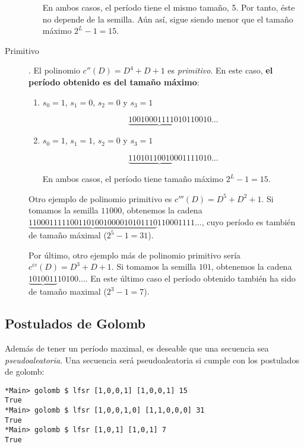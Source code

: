 \documentclass[10pt,spanish]{article}
\begin{document}
\begin{description}
\begin{enumerate}
        En ambos casos, el período tiene el mismo tamaño, 5. Por tanto, éste no depende de la semilla. Aún así, sigue siendo menor que el tamaño máximo $2^L - 1 = 15$.
    \end{enumerate}

    \item[Primitivo]. El polinomio $c''(D) = D^4 + D + 1$ es \textit{\textcolor{azul}{primitivo}}. En este caso, \textbf{\textcolor{azul}{el período obtenido es del tamaño máximo}}:

    \begin{enumerate}
        \item $s_0 = 1$, $s_1 = 0$, $s_2 = 0$ y $s_3 = 1$

        \begin{displaymath}
            \underbrace{100100011110101}10010\ldots
        \end{displaymath}

        \item $s_0 = 1$, $s_1 = 1$, $s_2 = 0$ y $s_3 = 1$

        \begin{displaymath}
            \underbrace{110101100100011}11010\ldots
        \end{displaymath}

        En ambos casos, el período tiene tamaño máximo $2^L - 1 = 15$.
    \end{enumerate}

    Otro ejemplo de polinomio primitivo es $c'''(D) = D^5 + D^2 + 1$. Si tomamos la semilla $11000$, obtenemos la cadena $\underbrace{1100011111001101001000010101110}110001111\ldots$, cuyo período es también de tamaño máximal ($2^5 - 1 = 31$).

    Por último, otro ejemplo más de polinomio primitivo sería $c^{iv}(D) = D^3 + D + 1$. Si tomamos la semilla $101$, obtenemos la cadena $\underbrace{1010011}10100\ldots$. En este último caso el período obtenido también ha sido de tamaño maximal ($2^3 - 1 = 7$).
\end{description}

\subsection{\textcolor{azul}Postulados de Golomb}
Además de tener un período maximal, es deseable que una secuencia sea \textit{\textcolor{azul}{pseudoaleatoria}}. Una secuencia será pseudoaleatoria si cumple con los postulados de golomb:

\begin{verbatim}
*Main> golomb $ lfsr [1,0,0,1] [1,0,0,1] 15
True
*Main> golomb $ lfsr [1,0,0,1,0] [1,1,0,0,0] 31
True
*Main> golomb $ lfsr [1,0,1] [1,0,1] 7
True
\end{verbatim}
\end{document}
